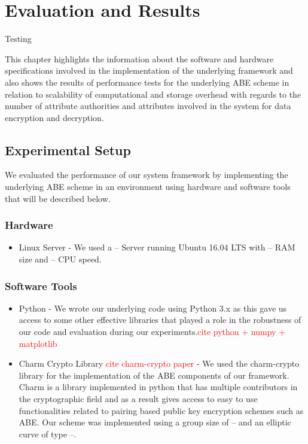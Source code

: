 \chapter{Evaluation and Results}
\label{chap:evaluation_and_results}

Testing

This chapter highlights the information about the software and hardware specifications involved in the implementation of the underlying framework and also shows the results of performance tests for the underlying ABE scheme in relation to scalability of computational and storage overhead with regards to the number of attribute authorities and attributes involved in the system for data encryption and decryption.

\section{Experimental Setup}

We evaluated the performance of our system framework by implementing the underlying ABE scheme in an environment using hardware and software tools that will be described below.

\subsection*{Hardware}
\begin{itemize}
	\item Linux Server - We used a -- Server running Ubuntu 16.04 LTS with -- RAM size and -- CPU speed.
\end{itemize}

\subsection*{Software Tools}
\begin{itemize}
	\item Python - We wrote our underlying code using Python 3.x as this gave us access to some other effective libraries that played a role in the robustness of our code and evaluation during our experiments.\textcolor{red}{cite python + numpy + matplotlib}
	
	\item Charm Crypto Library \textcolor{red}{cite charm-crypto paper} - We used the charm-crypto library for the implementation of the ABE components of our framework. Charm is a library implemented in python that has multiple contributors in the cryptographic field and as a result gives access to easy to use functionalities related to pairing based public key encryption schemes such as ABE. Our scheme was implemented using a group size of -- and an elliptic curve of type --.
\end{itemize}

